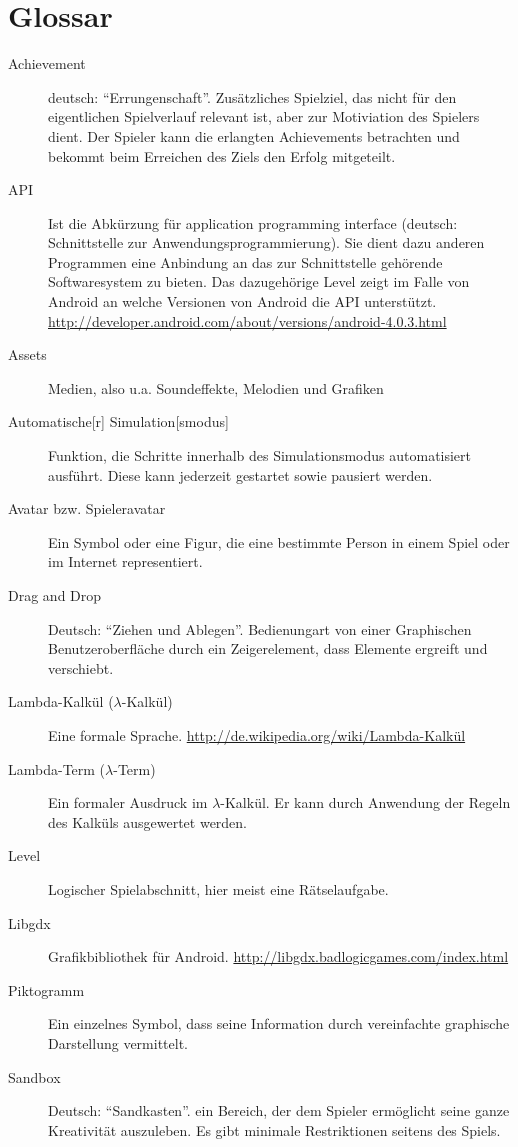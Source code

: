 \chapter{Glossar}
\begin{description}
	\item[Achievement] deutsch: ``Errungenschaft''. Zusätzliches Spielziel, das nicht für den eigentlichen Spielverlauf relevant ist, aber zur Motiviation des Spielers dient.
		Der Spieler kann die erlangten Achievements betrachten und bekommt beim Erreichen des Ziels den Erfolg mitgeteilt.
	\item[API] Ist die Abkürzung für application programming interface (deutsch: Schnittstelle zur Anwendungsprogrammierung). Sie dient dazu anderen Programmen eine Anbindung an das zur Schnittstelle gehörende Softwaresystem zu bieten. Das dazugehörige Level zeigt im Falle von Android an welche Versionen von Android die API unterstützt. \url{http://developer.android.com/about/versions/android-4.0.3.html}
	\item[Assets] Medien, also u.a. Soundeffekte, Melodien und Grafiken
	\item[Automatische{[}r{]} Simulation{[}smodus{]}] Funktion, die Schritte innerhalb des Simulationsmodus automatisiert ausführt. Diese kann jederzeit gestartet sowie pausiert werden.
	\item [Avatar bzw. Spieleravatar] Ein Symbol oder eine Figur, die eine bestimmte Person in einem Spiel oder im Internet representiert.
	\item [Drag and Drop] Deutsch: ``Ziehen und Ablegen''. Bedienungart von  einer Graphischen Benutzeroberfläche durch ein Zeigerelement, dass Elemente ergreift und verschiebt.
	\item[Lambda-Kalkül (\(\lambda\)-Kalkül)] Eine formale Sprache. \url{http://de.wikipedia.org/wiki/Lambda-Kalkül}
	\item[Lambda-Term (\(\lambda\)-Term)] Ein formaler Ausdruck im \(\lambda\)-Kalkül.
		Er kann durch Anwendung der Regeln des Kalküls ausgewertet werden.
	\item[Level] Logischer Spielabschnitt, hier meist eine Rätselaufgabe.
	\item[Libgdx] Grafikbibliothek für Android. \url{http://libgdx.badlogicgames.com/index.html}
	\item [Piktogramm] Ein einzelnes Symbol, dass seine Information durch vereinfachte graphische Darstellung vermittelt.
	\item [Sandbox] Deutsch: ``Sandkasten''. ein Bereich, der dem Spieler ermöglicht seine ganze Kreativität auszuleben. Es gibt minimale Restriktionen seitens des Spiels.

\end{description}
